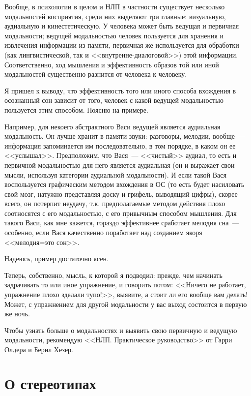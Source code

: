 \documentclass[a5paper,12pt,twoside]{memoir}
\begin{document}
Вообще, в психологии в целом и НЛП в частности существует несколько модальностей восприятия, среди них выделяют три главные: визуальную, аудиальную и кинестетическую. У человека может быть ведущая и первичная модальности; ведущей модальностью человек пользуется для хранения и извлечения информации из памяти, первичная же используется для обработки (как лингвистической, так и <<внутренне-диалоговой>>) этой информации. Соответственно, ход мышления и эффективность образов той или иной модальностей существенно разнится от человека к человеку.

Я пришел к выводу, что эффективность того или иного способа вхождения в осознанный сон зависит от того, человек с какой ведущей модальностью пользуется этим способом. Поясню на примере.

Например, для некоего абстрактного Васи ведущей является аудиальная модальность. Он лучше хранит в памяти звуки: разговоры, мелодии, вообще~--- информация запоминается им последовательно, в том порядке, в каком он ее <<услышал>>. Предположим, что Вася~--- <<чистый>> аудиал, то есть и первичной модальностью для него является аудиальная (он и выражает свои мысли, используя категории аудиальной модальности). И если такой Вася воспользуется графическим методом вхождения в ОС (то есть будет насиловать свой мозг, натужно представляя доску и грифель, выводящий цифры), скорее всего, он потерпит неудачу, т.к. предполагаемые методом действия плохо соотносятся с его модальностью, с его привычным способом мышления. Для такого Васи, как мне кажется, гораздо эффективнее сработает мелодия сна~--- особенно, если Вася качественно поработает над созданием якоря <<мелодия=это сон>>.

Надеюсь, пример достаточно ясен.
 
Теперь, собственно, мысль, к которой я подводил: прежде, чем начинать задрачивать то или иное упражнение, и говорить потом: <<Ничего не работает, упражнение плохо зделали тупо!>>, выявите, а стоит ли его вообще вам делать! Может, с упражнением для другой модальности у вас выход состоится в первую же ночь.

Чтобы узнать больше о модальностях и выявить свою первичную и ведущую модальности, рекомендую <<НЛП. Практическое руководство>> от Гарри Олдера и Берил Хезер.




\section{О стереотипах}
\end{document}
